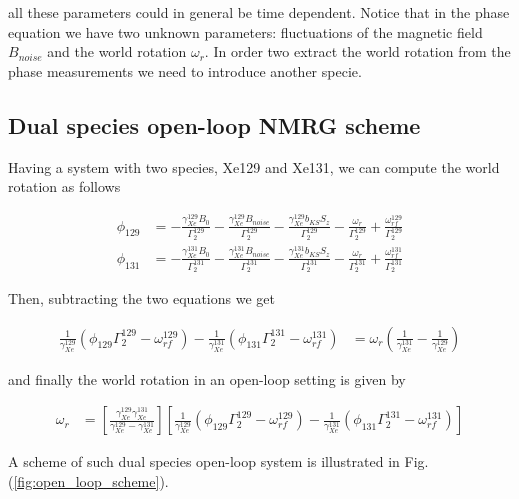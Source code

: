 \documentclass{article}
\begin{document}
all these parameters could in general be time dependent. Notice that in the phase equation we have two unknown parameters: fluctuations of the magnetic field $B_{noise}$ and the world rotation $\omega_r$. In order two extract the world rotation from the phase measurements we need to introduce another specie.  


\subsection{Dual species open-loop NMRG scheme}
Having a system with two species, Xe129 and Xe131, we can compute the world rotation as follows

\begin{align}
    \phi_{129} &= -\frac{\gamma^{129}_{Xe}B_0}{\Gamma_2^{129}}-\frac{\gamma^{129}_{Xe}B_{noise}}{\Gamma_2^{129}}-\frac{\gamma^{129}_{Xe}b_{KS}S_z}{\Gamma_2^{129}}-\frac{\omega_r}{\Gamma_2^{129}}+\frac{\omega^{129}_{rf}}{\Gamma_2^{129}}\\
    \phi_{131} &= -\frac{\gamma^{131}_{Xe}B_0}{\Gamma_2^{131}}-\frac{\gamma^{131}_{Xe}B_{noise}}{\Gamma_2^{131}}-\frac{\gamma^{131}_{Xe}b_{KS}S_z}{\Gamma_2^{131}}-\frac{\omega_r}{\Gamma_2^{131}}+\frac{\omega^{131}_{rf}}{\Gamma_2^{131}}
\end{align}

Then, subtracting the two equations we get

\begin{align}
    \frac{1}{\gamma^{129}_{Xe}}\left(\phi_{129}\Gamma_2^{129}-\omega^{129}_{rf}\right) - \frac{1}{\gamma^{131}_{Xe}}\left(\phi_{131}\Gamma_2^{131}-\omega^{131}_{rf}\right) &= \omega_r \left(\frac{1}{\gamma^{131}_{Xe}} - \frac{1}{\gamma^{129}_{Xe}}\right)
\end{align}

and finally the world rotation in an open-loop setting is given by 

\begin{align}
    \omega_r &= \left[\frac{ \gamma^{129}_{Xe} \gamma^{131}_{Xe} }{\gamma^{129}_{Xe} - \gamma^{131}_{Xe}}\right]\left[\frac{1}{\gamma^{129}_{Xe}}\left(\phi_{129}\Gamma_2^{129}-\omega^{129}_{rf}\right) - \frac{1}{\gamma^{131}_{Xe}}\left(\phi_{131}\Gamma_2^{131}-\omega^{131}_{rf}\right)\right]\label{eq:open-loop-world-rotation}
\end{align}

A scheme of such dual species open-loop system is illustrated in Fig.(\ref{fig:open_loop_scheme}).
\end{document}
